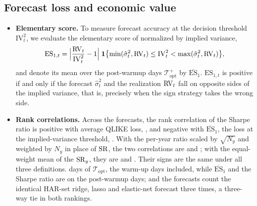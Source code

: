 \subsection{Forecast loss and economic value}
\label{app:rh_econ_rankcorr}
\begin{itemize}
\item \textbf{Elementary score.} To measure forecast accuracy at the decision threshold $\mathrm{IV}_t^2$, we
  evaluate the elementary score of \citet{Ehm2016} normalized by implied variance,
  \[
  \mathrm{ES}_{1,t} = \Bigl|\frac{\mathrm{RV}_t}{\mathrm{IV}_t^2} - 1\Bigr|\;
    \mathbf{1}\bigl\{\min(\hat\sigma^2_t, \mathrm{RV}_t) \le \mathrm{IV}_t^2 < \max(\hat\sigma^2_t, \mathrm{RV}_t)\bigr\},
  \]
  and denote its mean over the post-warmup days $\mathcal T_{\mathrm{opt}}^{+}$ by $\overline{\mathrm{ES}}_1$.
  $\mathrm{ES}_{1,t}$ is positive if and only if the forecast $\hat\sigma^2_t$ and the realization $\mathrm{RV}_t$ fall on
  opposite sides of the implied variance, that is, precisely when the sign strategy takes the wrong side.
\item \textbf{Rank correlations.} Across the \rhrPoolN{} forecasts, the rank correlation of the Sharpe ratio is
  positive with average QLIKE loss, \rheRankCorrQPool, and negative with $\overline{\mathrm{ES}}_1$, the loss at the
  implied-variance threshold, \rheRankCorrESPool. With the per-year ratio scaled by $\sqrt{N_y}$ and weighted by
  $N_y$ in place of $\mathrm{SR}$, the two correlations are \rheRankCorrQPoolDOne{} and \rheRankCorrESPoolDOne; with the
  equal-weight mean of the $\mathrm{SR}_y$, they are \rheRankCorrQPoolDSix{} and \rheRankCorrESPoolDSix.
  Their signs are the same under all three definitions.
  days of $\mathcal T_{\mathrm{opt}}$, the \rheSzWarmup{} warm-up days included, while $\overline{\mathrm{ES}}_1$ and
  the Sharpe ratio are on the \rheSzDays{} post-warmup days; and the \rhrPoolN{} forecasts count the identical
  HAR-set ridge, lasso and elastic-net forecast three times, a three-way tie in both rankings.
\end{itemize}

